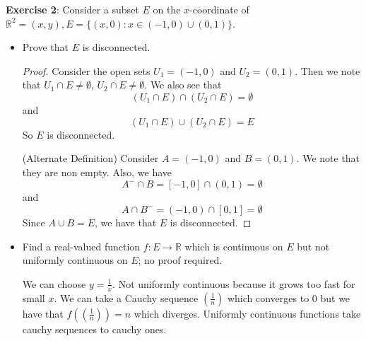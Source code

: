 \documentclass{article}
\begin{document}
\textbf{Exercise 2}: Consider a subset $E$ on the $x$-coordinate of $\mathbb{R}^{2} = (x, y), E = \{(x, 0) : x \in (-1, 0) \cup (0, 1)\}$.
    \begin{itemize}
        \item Prove that $E$ is disconnected.
            \begin{proof}
                Consider the open sets $U_{1} = (-1, 0)$ and $U_{2} = (0, 1)$. Then we note that $U_{1} \cap E \neq \emptyset$, $U_{2} \cap E \neq \emptyset$. We also see that 
                    \begin{equation*}
                        (U_{1} \cap E) \cap (U_{2} \cap E) = \emptyset
                    \end{equation*} 
                and
                    \begin{equation*}
                        (U_{1} \cap E) \cup (U_{2} \cap E) = E
                    \end{equation*}
                So $E$ is disconnected.

                (Alternate Definition) Consider $A = (-1, 0)$ and $B = (0, 1)$. We note that they are non empty. Also, we have
                    \begin{equation*}
                        A^{-} \cap B = [-1, 0] \cap (0, 1) = \emptyset
                    \end{equation*}
                and
                    \begin{equation*}
                        A \cap B^{-} = (-1, 0) \cap [0, 1] = \emptyset
                    \end{equation*}
                Since $A \cup B = E$, we have that $E$ is disconnected.
            \end{proof}

        \item Find a real-valued function $f : E \rightarrow \mathbb{R}$ which is continuous on $E$ but not uniformly continuous on $E$; no proof required. 
            \begin{answer}
                We can choose $y = \frac{1}{x}$. Not uniformly continuous because it grows too fast for small $x$. We can take a Cauchy sequence $(\frac{1}{n})$ which converges to $0$ but we have that $f((\frac{1}{n})) = n$ which diverges. Uniformly continuous functions take cauchy sequences to cauchy ones.
            \end{answer}
    \end{itemize}
\end{document}
